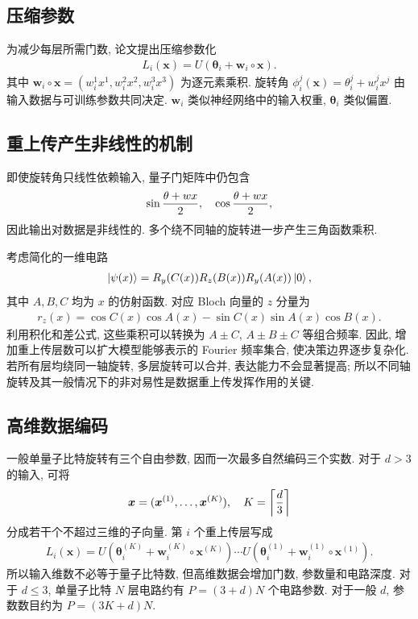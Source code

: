 \documentclass[a4paper]{ctexart}
\begin{document}
\subsection{压缩参数}

为减少每层所需门数, 论文提出压缩参数化
\begin{align}
    L_i(\bm{x})=U(\bm{\theta}_i+\bm{w}_i\circ\bm{x}).
\end{align}
其中 $\bm{w}_i\circ\bm{x}=(w_i^1x^1, w_i^2x^2, w_i^3x^3)$ 为逐元素乘积. 旋转角 $\phi_i^j(\bm{x})=\theta_i^j+w_i^j x^j$ 由输入数据与可训练参数共同决定. $\bm{w}_i$ 类似神经网络中的输入权重, $\bm{\theta}_i$ 类似偏置.

\subsection{重上传产生非线性的机制}

即使旋转角只线性依赖输入, 量子门矩阵中仍包含
\begin{align}
    \sin\frac{\theta+wx}{2}, \quad \cos\frac{\theta+wx}{2},
\end{align}
因此输出对数据是非线性的. 多个绕不同轴的旋转进一步产生三角函数乘积.

考虑简化的一维电路
\begin{align}
    \ket{\psi(x)}=R_y(C(x)) R_z(B(x))R_y(A(x))\ket{0},
\end{align}
其中 $A, B, C$ 均为 $x$ 的仿射函数. 对应 Bloch 向量的 $z$ 分量为
\begin{align}
    r_z(x)=\cos C(x)\cos A(x)-\sin C(x)\sin A(x)\cos B(x).
\end{align}
利用积化和差公式, 这些乘积可以转换为 $A\pm C$, $A\pm B\pm C$ 等组合频率. 因此, 增加重上传层数可以扩大模型能够表示的 Fourier 频率集合, 使决策边界逐步复杂化. 若所有层均绕同一轴旋转, 多层旋转可以合并, 表达能力不会显著提高; 所以不同轴旋转及其一般情况下的非对易性是数据重上传发挥作用的关键.

\subsection{高维数据编码}

一般单量子比特旋转有三个自由参数, 因而一次最多自然编码三个实数. 对于 $d>3$ 的输入, 可将
\begin{align}
    \bm{x}=(\bm{x}^{(1)}, \ldots, \bm{x}^{(K)}), \quad K=\left\lceil\frac{d}{3}\right\rceil
\end{align}
分成若干个不超过三维的子向量. 第 $i$ 个重上传层写成
\begin{align}
    L_i(\bm{x})=U(\bm{\theta}_i^{(K)}+\bm{w}_i^{(K)}\circ\bm{x}^{(K)})\cdots U(\bm{\theta}_i^{(1)}+\bm{w}_i^{(1)}\circ\bm{x}^{(1)}).
\end{align}
所以输入维数不必等于量子比特数, 但高维数据会增加门数, 参数量和电路深度. 对于 $d\le3$, 单量子比特 $N$ 层电路约有 $P=(3+d)N$ 个电路参数. 对于一般 $d$, 参数数目约为 $P=(3K+d)N$.
\end{document}

